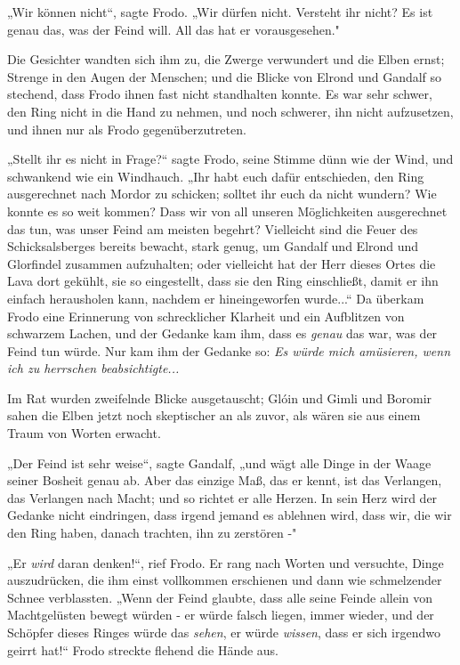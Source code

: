 {„Wir können nicht“, sagte Frodo. „Wir dürfen nicht. Versteht ihr nicht? Es ist genau das, was der Feind will. All das hat er vorausgesehen."

Die Gesichter wandten sich ihm zu, die Zwerge verwundert und die Elben ernst; Strenge in den Augen der Menschen; und die Blicke von Elrond und Gandalf so stechend, dass Frodo ihnen fast nicht standhalten konnte. Es war sehr schwer, den Ring nicht in die Hand zu nehmen, und noch schwerer, ihn nicht aufzusetzen, und ihnen nur als Frodo gegenüberzutreten.

„Stellt ihr es nicht in Frage?“ sagte Frodo, seine Stimme dünn wie der Wind, und schwankend wie ein Windhauch. „Ihr habt euch dafür entschieden, den Ring ausgerechnet nach Mordor zu schicken; solltet ihr euch da nicht wundern? Wie konnte es so weit kommen? Dass wir von all unseren Möglichkeiten ausgerechnet das tun, was unser Feind am meisten begehrt? Vielleicht sind die Feuer des Schicksalsberges bereits bewacht, stark genug, um Gandalf und Elrond und Glorfindel zusammen aufzuhalten; oder vielleicht hat der Herr dieses Ortes die Lava dort gekühlt, sie so eingestellt, dass sie den Ring einschließt, damit er ihn einfach herausholen kann, nachdem er hineingeworfen wurde...“ Da überkam Frodo eine Erinnerung von schrecklicher Klarheit und ein Aufblitzen von schwarzem Lachen, und der Gedanke kam ihm, dass es \emph{genau} das war, was der Feind tun würde. Nur kam ihm der Gedanke so: \emph{Es würde mich amüsieren, wenn ich zu herrschen beabsichtigte...}

Im Rat wurden zweifelnde Blicke ausgetauscht; Glóin und Gimli und Boromir sahen die Elben jetzt noch skeptischer an als zuvor, als wären sie aus einem Traum von Worten erwacht.

„Der Feind ist sehr weise“, sagte Gandalf, „und wägt alle Dinge in der Waage seiner Bosheit genau ab. Aber das einzige Maß, das er kennt, ist das Verlangen, das Verlangen nach Macht; und so richtet er alle Herzen. In sein Herz wird der Gedanke nicht eindringen, dass irgend jemand es ablehnen wird, dass wir, die wir den Ring haben, danach trachten, ihn zu zerstören -"

„Er \emph{wird} daran denken!“, rief Frodo. Er rang nach Worten und versuchte, Dinge auszudrücken, die ihm einst vollkommen erschienen und dann wie schmelzender Schnee verblassten. „Wenn der Feind glaubte, dass alle seine Feinde allein von Machtgelüsten bewegt würden - er würde falsch liegen, immer wieder, und der Schöpfer dieses Ringes würde das \emph{sehen}, er würde \emph{wissen}, dass er sich irgendwo geirrt hat!“ Frodo streckte flehend die Hände aus.

}

